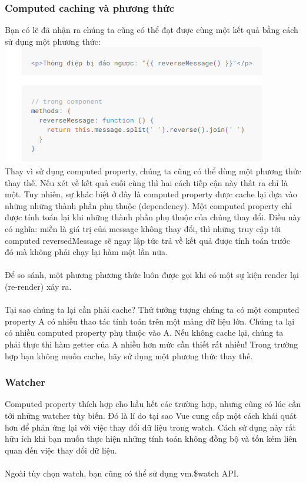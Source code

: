 \documentclass[12pt,a4paper]{report}
\begin{document}
\subsubsection{Computed caching và phương thức}
Bạn có lẽ đã nhận ra chúng ta cũng có thể đạt được cùng một kết quả bằng cách sử dụng một phương thức:\\
\includegraphics[scale=1]{20}\\Thay vì sử dụng computed property, chúng ta cũng có thể dùng một phương thức thay thế. Nếu xét về kết quả cuối cùng thì hai cách tiếp cận này thât ra chỉ là một. Tuy nhiên, sự khác biệt ở đây là computed property được cache lại dựa vào những những thành phần phụ thuộc (dependency). Một computed property chỉ được tính toán lại khi những thành phần phụ thuộc của chúng thay đổi. Điều này có nghĩa: miễn là giá trị của message không thay đổi, thì những truy cập tới computed reversedMessage sẽ ngay lập tức trả về kết quả được tính toán trước đó mà không phải chạy lại hàm một lần nữa.\\\\Để so sánh, một phương phương thức luôn được gọi khi có một sự kiện render lại (re-render) xảy ra.\\\\Tại sao chúng ta lại cần phải cache? Thử tưởng tượng chúng ta có một computed property A có nhiều thao tác tính toán trên một mảng dữ liệu lớn. Chúng ta lại có nhiều computed property phụ thuộc vào A. Nếu không cache lại, chúng ta phải thực thi hàm getter của A nhiều hơn mức cần thiết rất nhiều! Trong trường hợp bạn không muốn cache, hãy sử dụng một phương thức thay thế.
\subsubsection{Watcher}Computed property thích hợp cho hầu hết các trường hợp, nhưng cũng có lúc cần tới những watcher tùy biến. Đó là lí do tại sao Vue cung cấp một cách khái quát hơn để phản ứng lại với việc thay đổi dữ liệu trong watch. Cách sử dụng này rất hữu ích khi bạn muốn thực hiện những tính toán không đồng bộ và tốn kém liên quan đến việc thay đổi dữ liệu.\\\\ Ngoài tùy chọn watch, bạn cũng có thể sử dụng vm.\$watch API.
\end{document}
